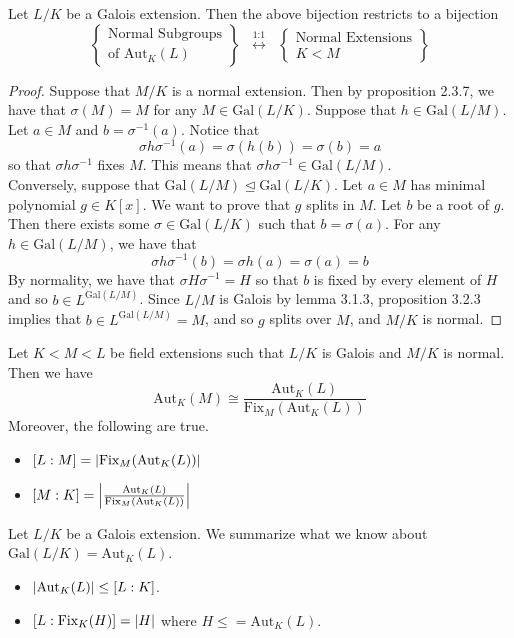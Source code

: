\documentclass[a4paper]{article}
\begin{document}
\begin{prp}{}{} Let $L/K$ be a Galois extension. Then the above bijection restricts to a bijection $$\left\{\substack{\text{Normal Subgroups}\\\text{of }\text{Aut}_K(L)}\right\}\;\;\overset{\text{1:1}}{\longleftrightarrow}\;\;\left\{\substack{\text{Normal Extensions}\\ K<M}\right\}$$ 
\begin{proof}
Suppose that $M/K$ is a normal extension. Then by proposition 2.3.7, we have that $\sigma(M)=M$ for any $M\in\text{Gal}(L/K)$. Suppose that $h\in\text{Gal}(L/M)$. Let $a\in M$ and $b=\sigma^{-1}(a)$. Notice that $$\sigma h\sigma^{-1}(a)=\sigma(h(b))=\sigma(b)=a$$ so that $\sigma h\sigma^{-1}$ fixes $M$. This means that $\sigma h\sigma^{-1}\in\text{Gal}(L/M)$. \\

Conversely, suppose that $\text{Gal}(L/M)\trianglelefteq\text{Gal}(L/K)$. Let $a\in M$ has minimal polynomial $g\in K[x]$. We want to prove that $g$ splits in $M$. Let $b$ be a root of $g$. Then there exists some $\sigma\in\text{Gal}(L/K)$ such that $b=\sigma(a)$. For any $h\in\text{Gal}(L/M)$, we have that $$\sigma h\sigma^{-1}(b)=\sigma h(a)=\sigma(a)=b$$ By normality, we have that $\sigma H\sigma^{-1}=H$ so that $b$ is fixed by every element of $H$ and so $b\in L^{\text{Gal}(L/M)}$. Since $L/M$ is Galois by lemma 3.1.3, proposition 3.2.3 implies that $b\in L^{\text{Gal}(L/M)}=M$, and so $g$ splits over $M$, and $M/K$ is normal. 
\end{proof}
\end{prp}

\begin{prp}{}{} Let $K<M<L$ be field extensions such that $L/K$ is Galois and $M/K$ is normal. Then we have $$\text{Aut}_K(M)\cong\frac{\text{Aut}_K(L)}{\text{Fix}_M(\text{Aut}_K(L))}$$ Moreover, the following are true. 
\begin{itemize}
\item $[L:M]=\abs{\text{Fix}_M(\text{Aut}_K(L))}$
\item $[M:K]=\abs{\frac{\text{Aut}_K(L)}{\text{Fix}_M(\text{Aut}_K(L))}}$
\end{itemize}
\end{prp}

Let $L/K$ be a Galois extension. We summarize what we know about $\text{Gal}(L/K)=\text{Aut}_K(L)$. 
\begin{itemize}
\item $\abs{\text{Aut}_K(L)}\leq [L:K]$. 
\item $[L:\text{Fix}_K(H)]=\abs{H}$ where $H\leq=\text{Aut}_K(L)$. 
\end{itemize}
\end{document}
